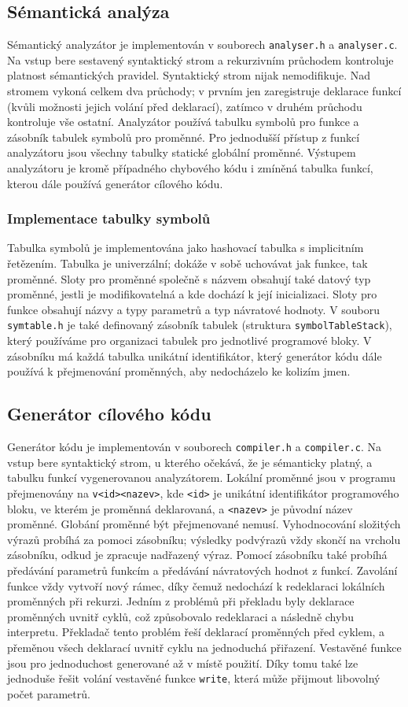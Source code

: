 \subsection{Sémantická analýza}
Sémantický analyzátor je implementován v souborech \texttt{analyser.h} a \texttt{analyser.c}.
Na vstup bere sestavený syntaktický strom a rekurzivním průchodem kontroluje platnost sémantických pravidel.
Syntaktický strom nijak nemodifikuje.
Nad stromem vykoná celkem dva průchody; v prvním jen zaregistruje deklarace funkcí (kvůli možnosti jejich volání před deklarací),
zatímco v druhém průchodu kontroluje vše ostatní.
Analyzátor používá tabulku symbolů pro funkce a zásobník tabulek symbolů pro proměnné.
Pro jednodušší přístup z funkcí analyzátoru jsou všechny tabulky statické globální proměnné.
Výstupem analyzátoru je kromě případného chybového kódu i zmíněná tabulka funkcí, kterou dále používá generátor cílového kódu.

\subsubsection{Implementace tabulky symbolů}
Tabulka symbolů je implementována jako hashovací tabulka s implicitním řetězením.
Tabulka je univerzální; dokáže v sobě uchovávat jak funkce, tak proměnné.
Sloty pro proměnné společně s názvem obsahují také datový typ proměnné,
jestli je modifikovatelná a kde dochází k její inicializaci.
Sloty pro funkce obsahují názvy a typy parametrů a typ návratové hodnoty.
V souboru \texttt{symtable.h} je také definovaný zásobník tabulek (struktura \texttt{symbolTableStack}),
který používáme pro organizaci tabulek pro jednotlivé programové bloky.
V zásobníku má každá tabulka unikátní identifikátor,
který generátor kódu dále používá k přejmenování proměnných, aby nedocházelo ke kolizím jmen.

\subsection{Generátor cílového kódu}
Generátor kódu je implementován v souborech \texttt{compiler.h} a \texttt{compiler.c}.
Na vstup bere syntaktický strom, u kterého očekává, že je sémanticky platný, a tabulku funkcí vygenerovanou analyzátorem.
Lokální proměnné jsou v programu přejmenovány na \texttt{v<id><nazev>}, kde \texttt{<id>} je unikátní identifikátor
programového bloku, ve kterém je proměnná deklarovaná, a \texttt{<nazev>} je původní název proměnné.
Globání proměnné být přejmenované nemusí.
Vyhodnocování složitých výrazů probíhá za pomoci zásobníku; výsledky podvýrazů vždy skončí na vrcholu zásobníku, odkud je zpracuje nadřazený výraz.
Pomocí zásobníku také probíhá předávání parametrů funkcím a předávání návratových hodnot z funkcí.
Zavolání funkce vždy vytvoří nový rámec, díky čemuž nedochází k redeklaraci lokálních proměnných při rekurzi.
Jedním z problémů při překladu byly deklarace proměnných uvnitř cyklů, což způsobovalo redeklaraci a následně chybu interpretu.
Překladač tento problém řeší deklarací proměnných před cyklem, a přeměnou všech deklarací uvnitř cyklu na jednoduchá přiřazení.
Vestavěné funkce jsou pro jednoduchost generované až v místě použití.
Díky tomu také lze jednoduše řešit volání vestavěné funkce \texttt{write}, která může přijmout libovolný počet parametrů.
